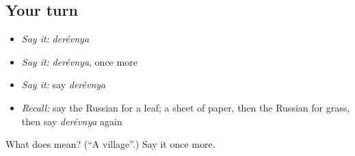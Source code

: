 \subsection*{Your turn}
\begin{itemize}
\raggedright
  \item \emph{Say it:} \emph{derévnya}
  \item \emph{Say it:} \emph{derévnya}, once more
  \item \emph{Say it:} say \emph{derévnya}
  \item \emph{Recall:} say the Russian for a leaf; a sheet of paper, then the Russian for grass, then say \emph{derévnya} again
\end{itemize}

\begin{tcolorbox}[breakable,colback=teal!4,colframe=teal!35!black,title={Before you move on}]
What does  mean? (\textquotedblleft{}A village\textquotedblright{}.) Say it once more.
\end{tcolorbox}
